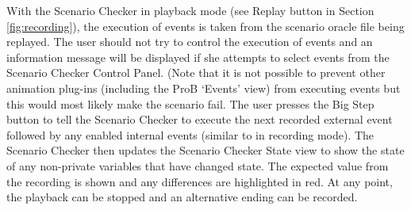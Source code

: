 With the Scenario Checker in playback mode (see Replay button in Section \ref{fig:recording}), the execution of events is taken from the scenario oracle file being replayed.
The user should not try to control the execution of events and an information message will be displayed if she attempts to select events from the Scenario Checker Control Panel. 
(Note that it is not possible to prevent other animation plug-ins (including the ProB `Events' view) from executing events but this would most likely make the scenario fail. 
The user presses the Big Step button to tell the Scenario Checker to execute the next recorded external event followed by any enabled internal events (similar to in recording mode).
The Scenario Checker then updates the Scenario Checker State view to show the state of any non-private variables that have changed state.
The expected value from the recording is shown and any differences are highlighted in red.
At any point, the playback can be stopped and an alternative ending can be recorded.

